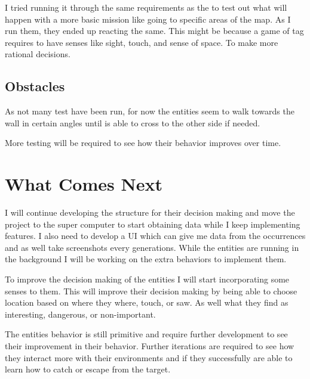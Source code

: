 \documentclass[10pt, letterpaper]{article}
\begin{document}
\begin{Form}
	I tried running it through the same requirements as the  \parencite{ProgrammedSomeCreatures}
	to test out what will happen with a more basic mission like going to specific areas of the map. As I run them,
	they ended up reacting the same. This might be because a game of tag requires to have senses like sight, touch,
	and sense of space. To make more rational decisions.

	\subsection{Obstacles}
	As not many test have been run, for now the entities seem to walk towards the wall in certain angles until is able to cross
	to the other side if needed.

	More testing will be required to see how their behavior improves over time.

	\section{What Comes Next}

	I will continue developing the structure for their decision making and move the project to the super computer to start
	obtaining data while I keep implementing features.
	I also need to develop a UI which can give me data from the occurrences and as well take screenshots every generations.
	While the entities are running in the background I will be working on the extra behaviors to implement them.

	To improve the decision making of the entities I will start incorporating some senses to them. This will improve
	their decision making by being able to choose location based on where they where, touch, or saw. As well what
	they find as interesting, dangerous, or non-important.

	The entities behavior is still primitive and require further development to see their improvement in their behavior.
	Further iterations are required to see how they interact more with their environments and if they successfully are able to
	learn how to catch or escape from the target.

\end{Form}

\printbibliography[heading=bibintoc]
\end{document}

